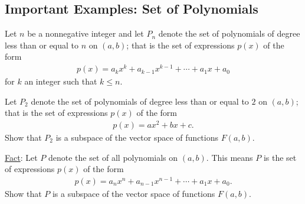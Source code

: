\documentclass[12pt,a4paper]{article}
\newcounter{example}[section]
\begin{document}
	
	
	
	
	\subsection{Important Examples: Set of Polynomials}
	Let $n$ be a nonnegative integer and let $P_{n}$ denote the set of polynomials of degree less than or equal to $n$ on $(a, b)$; that is the set of expressions $p(x)$ of the form
		\begin{align*}
		p(x) = a_kx^k + a_{k-1}x^{k-1} + \cdots + a_1 x + a_0 
		\end{align*}
	for $k$ an integer such that $k \leq n$.
	
	\begin{example}
	Let $P_2$ denote the set of polynomials of degree less than or equal to $2$ on $(a, b )$; that is the set of expressions $p(x)$ of the form
		\begin{align*}
		p(x) = ax^2 + bx + c .
		\end{align*}
	Show that $P_2$ is a subspace of the vector space of functions $F (a, b)$.
	\end{example}
	
	\vfill
	
	\underline{Fact}:
	Let $P$ denote the set of all polynomials on $(a, b)$. This means $P$ is the set of expressions $p(x)$ of the form
		\begin{align*}
		p(x) = a_n x^n + a_{n-1}x^{n-1} + \cdots + a_1 x + a_0 .
		\end{align*}
	Show that $P$ is a subspace of the vector space of functions $F(a, b)$.
	
	
	
\end{document}
